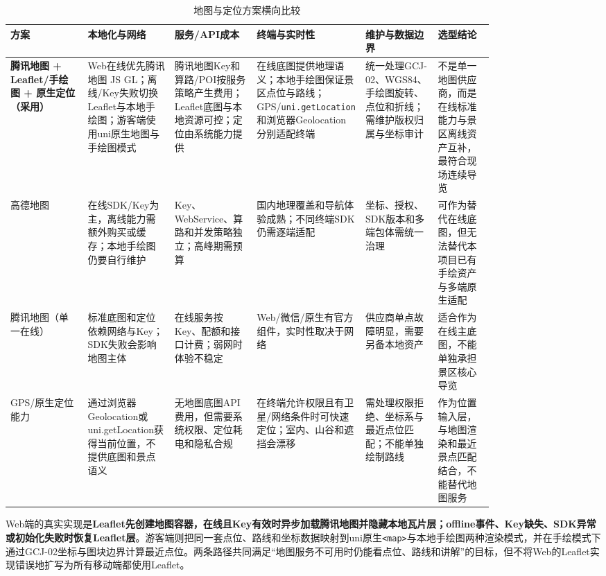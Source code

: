 \begin{landscape}
\begin{table}[H]
  \centering
  \caption{地图与定位方案横向比较}\label{tab:compare-map}
  \small
  \renewcommand{\arraystretch}{1.18}
  \begin{tabularx}{\linewidth}{p{0.16\linewidth}p{0.18\linewidth}p{0.17\linewidth}p{0.15\linewidth}p{0.15\linewidth}X}
    \toprule
    方案 & 本地化与网络 & 服务/API成本 & 终端与实时性 & 维护与数据边界 & 选型结论 \\
    \midrule
    \textbf{腾讯地图 + Leaflet/手绘图 + 原生定位（采用）} & Web在线优先腾讯地图 JS GL；离线/Key失败切换Leaflet与本地手绘图；游客端使用uni原生地图与手绘图模式 & 腾讯地图Key和算路/POI按服务策略产生费用；Leaflet底图与本地资源可控；定位由系统能力提供 & 在线底图提供地理语义；本地手绘图保证景区点位与路线；GPS/\texttt{uni.getLocation}和浏览器Geolocation分别适配终端 & 统一处理GCJ-02、WGS84、手绘图旋转、点位和折线；需维护版权归属与坐标审计 & 不是单一地图供应商，而是在线标准能力与景区离线资产互补，最符合现场连续导览 \\
    \midrule
    高德地图 & 在线SDK/Key为主，离线能力需额外购买或缓存；本地手绘图仍要自行维护 & Key、WebService、算路和并发策略独立；高峰期需预算 & 国内地理覆盖和导航体验成熟；不同终端SDK仍需逐端适配 & 坐标、授权、SDK版本和多端包体需统一治理 & 可作为替代在线底图，但无法替代本项目已有手绘资产与多端原生适配 \\
    \midrule
    腾讯地图（单一在线） & 标准底图和定位依赖网络与Key；SDK失败会影响地图主体 & 在线服务按Key、配额和接口计费；弱网时体验不稳定 & Web/微信/原生有官方组件，实时性取决于网络 & 供应商单点故障明显，需要另备本地资产 & 适合作为在线主底图，不能单独承担景区核心导览 \\
    \midrule
    GPS/原生定位能力 & 通过浏览器Geolocation或uni.getLocation获得当前位置，不提供底图和景点语义 & 无地图底图API费用，但需要系统权限、定位耗电和隐私合规 & 在终端允许权限且有卫星/网络条件时可快速定位；室内、山谷和遮挡会漂移 & 需处理权限拒绝、坐标系与最近点位匹配；不能单独绘制路线 & 作为位置输入层，与地图渲染和最近景点匹配结合，不能替代地图服务 \\
    \bottomrule
  \end{tabularx}
\end{table}
\end{landscape}

Web端的真实实现是\textbf{Leaflet先创建地图容器，在线且Key有效时异步加载腾讯地图并隐藏本地瓦片层；offline事件、Key缺失、SDK异常或初始化失败时恢复Leaflet层}。游客端则把同一套点位、路线和坐标数据映射到uni原生\texttt{<map>}与本地手绘图两种渲染模式，并在手绘模式下通过GCJ-02坐标与图块边界计算最近点位。两条路径共同满足“地图服务不可用时仍能看点位、路线和讲解”的目标，但不将Web的Leaflet实现错误地扩写为所有移动端都使用Leaflet。

